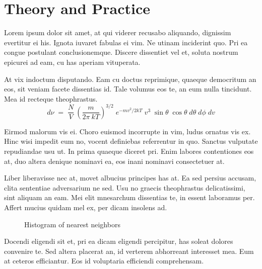 \cleartooddpage[\thispagestyle{empty}]
\chapter{Theory and Practice}\label{CHAPTER2}

Lorem ipsum dolor sit amet, at qui viderer recusabo aliquando, dignissim 
evertitur ei his. Ignota iuvaret fabulas ei vim. Ne utinam inciderint quo. 
Pri ea congue postulant conclusionemque. \cite{SMEAGOL_02}
Discere dissentiet vel et, soluta nostrum epicurei ad eam, cu has aperiam
vituperata. 

At vix indoctum disputando. Eam cu doctus reprimique, quaeque democritum 
an eos, sit veniam facete dissentias id. Tale volumus eos te, an eum nulla 
tincidunt. Mea id recteque theophrastus.
\begin{equation}
  d\nu \;=\; \frac{N}{V}\:\left( \frac{m}{2\pi\:kT} \right)^{3/2}\;
             e^{-mv^2/2kT}\;v^3\;
             \sin\theta\;\cos\theta\;d\theta\;d\phi\;dv
  \label{CHAPTER2_EQN01}
\end{equation}

Eirmod malorum vis ei. Choro euismod incorrupte in vim, ludus ornatus vis ex. 
Hinc wisi impedit eum no, vocent definiebas referrentur in quo. Sanctus 
vulputate repudiandae usu ut. In prima quaeque diceret pri. Enim labores 
contentiones eos at, duo altera denique nominavi ea, eos inani nominavi 
consectetuer at.

Liber liberavisse nec at, movet albucius principes has at. Ea sed persius 
accusam, clita sententiae adversarium ne sed. Usu no graecis theophrastus 
delicatissimi, sint aliquam an eam. Mei elit mnesarchum dissentias te, in 
essent laboramus per. Affert mucius quidam mel ex, per dicam insolens ad.

\begin{figure}[htb]
  \begin{center}
  \end{center}
  \caption{Histogram of nearest neighbors}
  \label{CHAPTER2_FIG01}
\end{figure}

Docendi eligendi sit et, pri ea dicam eligendi percipitur, has soleat 
dolores convenire te. Sed altera placerat an, id verterem abhorreant 
interesset mea. Eum at ceteros efficiantur. Eos id voluptaria efficiendi 
comprehensam. 

